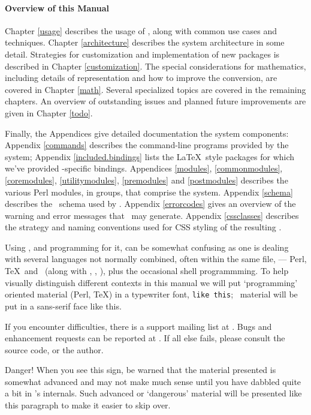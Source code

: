 \documentclass{book}
\begin{document}
\paragraph[Overview]{Overview of this Manual}
Chapter \ref{usage} describes the usage of \LaTeXML, along with
common use cases and techniques.  Chapter \ref{architecture} describes
the system architecture in some detail. Strategies for customization
and implementation of new packages is described in Chapter \ref{customization}.
The special considerations for mathematics, including details of representation
and how to improve the conversion, are covered in Chapter \ref{math}.
Several specialized topics are covered in the remaining chapters.
An overview of outstanding issues and planned future improvements
are given in Chapter \ref{todo}.

Finally, the Appendices give detailed documentation the system components:
Appendix \ref{commands} describes the command-line programs provided by the system;
Appendix \ref{included.bindings} lists the \LaTeX\ style packages for which
we've provided \LaTeXML-specific bindings.
Appendices \ref{modules},  \ref{commonmodules}, \ref{coremodules}, \ref{utilitymodules},
\ref{premodules} and \ref{postmodules}
describes the various Perl modules, in groups, that comprise the system.
Appendix \ref{schema} describes the \XML\ schema used by \LaTeXML.
Appendix \ref{errorcodes} gives an overview of the warning and
error messages that \LaTeXML\ may generate.
Appendix \ref{cssclasses} describes the strategy and naming conventions
used for CSS styling of the resulting \HTML.

Using \LaTeXML, and programming for it, can be somewhat confusing as one is dealing with several
languages not normally combined, often within the same file,
--- Perl, \TeX\ and \XML\ (along with \XSLT, \HTML, \CSS),
plus the occasional shell programmming.
To help visually distinguish different contexts in this manual
we will put `programming' oriented material (Perl, \TeX) in a typewriter font,
\texttt{like this}; \XML\ material will be put in a sans-serif face
\textsf{like this}.

\vskip 1cm\relax
If you encounter difficulties, there is a support mailing list at
.
Bugs and enhancement requests can be reported at
.
If all else fails, please consult the source code, or the author.

\begin{advanced}
Danger! When you see this sign, be warned that the material presented is
somewhat advanced and may not make much sense until you have dabbled quite
a bit in \LaTeXML's internals.
Such advanced or `dangerous' material will be presented like this paragraph
to make it easier to skip over.
\end{advanced}
\end{document}
